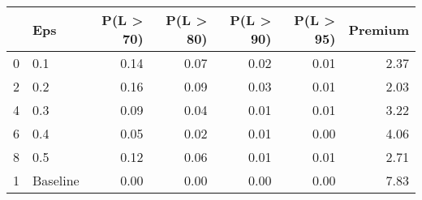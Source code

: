 \begin{tabular}{llrrrrr}
\toprule
{} &       Eps &  P(L > 70) &  P(L > 80) &  P(L > 90) &  P(L > 95) &  Premium \\
\midrule
0 &       0.1 &       0.14 &       0.07 &       0.02 &       0.01 &     2.37 \\
2 &       0.2 &       0.16 &       0.09 &       0.03 &       0.01 &     2.03 \\
4 &       0.3 &       0.09 &       0.04 &       0.01 &       0.01 &     3.22 \\
6 &       0.4 &       0.05 &       0.02 &       0.01 &       0.00 &     4.06 \\
8 &       0.5 &       0.12 &       0.06 &       0.01 &       0.01 &     2.71 \\
1 &  Baseline &       0.00 &       0.00 &       0.00 &       0.00 &     7.83 \\
\bottomrule
\end{tabular}
